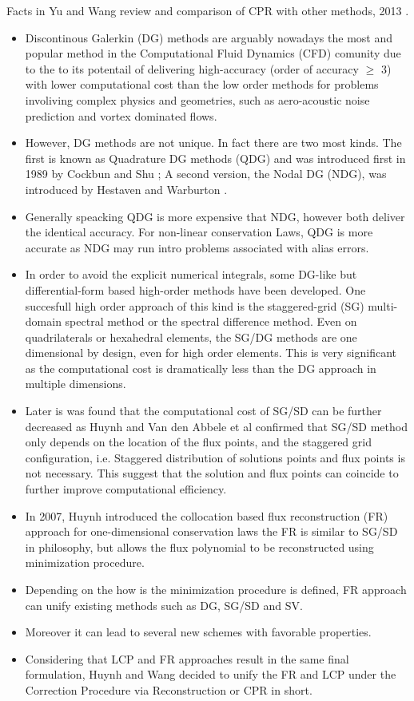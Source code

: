 \begin{frame}[allowframebreaks]
 Facts in Yu and Wang review and comparison of CPR with other methods, 2013 \cite{Yu&Wang2013}. 
 \begin{itemize}
  \item Discontinous Galerkin (DG) methods are arguably nowadays the most and popular method in the Computational Fluid Dynamics (CFD) comunity due to the to its potentail of delivering high-accuracy (order of accuracy $\ge$ 3) with lower computational cost than the low order methods for problems involiving complex physics and geometries, such as aero-acoustic noise prediction and vortex dominated flows.
  \item However, DG methods are not unique. In fact there are two most kinds. The first is known as Quadrature DG methods (QDG) and was introduced first in 1989 by Cockbun and Shu \cite{Cockburn&Shu1989a,CockburnLin&Shu1989b}; A second version, the Nodal DG (NDG), was introduced by Hestaven and Warburton \cite{hesthaven2008}.
  \item Generally speacking QDG is more expensive that NDG, however both deliver the identical accuracy. For non-linear conservation Laws, QDG is more accurate as NDG may run intro problems associated with alias errors. 
  \item In order to avoid the explicit numerical integrals, some DG-like but differential-form based high-order methods have been developed. One succesfull high order approach of this kind is the staggered-grid (SG) multi-domain spectral method or the spectral difference method. Even on quadrilaterals or hexahedral elements, the SG/DG methods are one dimensional by design, even for high order elements. This is very significant as the computational cost is dramatically less than the DG approach in multiple dimensions.
  \item Later is was found that the computational cost of SG/SD can be further decreased as Huynh \cite{Huynh2007} and Van den Abbele et al \cite{Abbele} confirmed that SG/SD method only depends on the location of the flux points, and the staggered grid configuration, i.e. Staggered distribution of solutions points and flux points is not necessary. This suggest that the solution and flux points can coincide to further improve computational efficiency.
  \item In 2007, Huynh introduced the collocation based flux reconstruction (FR) approach for one-dimensional conservation laws
 the FR is similar to SG/SD in philosophy, but allows the flux polynomial to be reconstructed using minimization procedure.
  \item Depending on the how is the minimization procedure is defined, FR approach can unify existing methods such as DG, SG/SD and SV. 
  \item Moreover it can lead to several new schemes with favorable properties.
  \item Considering that LCP and FR approaches result in the same final formulation, Huynh and Wang decided to unify the FR and LCP under the Correction Procedure via Reconstruction or CPR in short.
 \end{itemize}
\end{frame}

